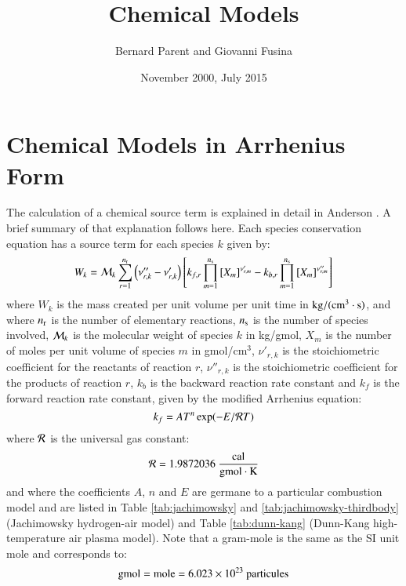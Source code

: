 \documentclass{warpdoc}
\author{
  Bernard Parent and Giovanni Fusina
}
\title{Chemical Models
}
\date{
  November 2000, July 2015
}
\newcommand{\ns}{{{n}_{\rm s}}}
\newcommand{\nr}{{{n}_{\rm r}}}
\begin{document}
  \pagestyle{headings}
  \setcounter{page}{1}
  \makewarpdoctitle
  \tableofcontents
  \listoftables



\section{Chemical Models in Arrhenius Form}



The calculation of a chemical source term is explained in detail in Anderson \cite{book:1989:anderson}.
A brief summary of that explanation follows here.
Each species conservation equation has a source term for each species $k$ given by:
%
\begin{equation}
W_k = {\cal M}_k \sum_{r=1}^{\nr} \left( \nu''_{r,k} - \nu'_{r,k} \right)
\left[ k_{f,r} \prod_{m=1}^{\ns} \left[ X_m \right]^{\nu'_{r,m}}
- k_{b,r} \prod_{m=1}^{\ns} \left[ X_m \right]^{\nu''_{r,m}} \right]
\end{equation}
%
where $W_k$ is the mass created per unit volume per unit time in $\rm kg/(cm^3\cdot s)$, and where $\nr$ is the number of elementary reactions, $\ns$ is the number of species involved, ${\cal M}_k$ is the molecular weight of species $k$ in kg/gmol, $X_m$ is the number of moles per unit volume of species $m$ in gmol/cm$^3$, $\nu'_{r,k}$ is the stoichiometric coefficient for the reactants of reaction $r$, $\nu''_{r,k}$ is the stoichiometric coefficient for the products of reaction $r$, $k_b$ is the backward reaction rate constant and
$k_f$ is the forward reaction rate constant, given by the
modified Arrhenius equation:
%
\begin{equation}
k_f = AT^n \exp(-E/{\cal R}T)
\end{equation}
%
where $\cal R$ is the universal gas constant:
%
\begin{equation}
 {\cal R}=1.9872036 ~\frac{\rm cal}{\rm gmol\cdot K}
\end{equation}
%
and where the coefficients $A$, $n$ and $E$ are germane to a particular combustion
model and are listed in  Table \ref{tab:jachimowsky} and \ref{tab:jachimowsky-thirdbody} (Jachimowsky hydrogen-air model) and Table \ref{tab:dunn-kang} (Dunn-Kang high-temperature air plasma model). Note that a gram-mole is the same as the SI unit mole and corresponds to:
%
\begin{equation}
{\rm gmol}={\rm mole}=6.023 \times 10^{23}~{\rm particules}
\end{equation}
%
\end{document}
